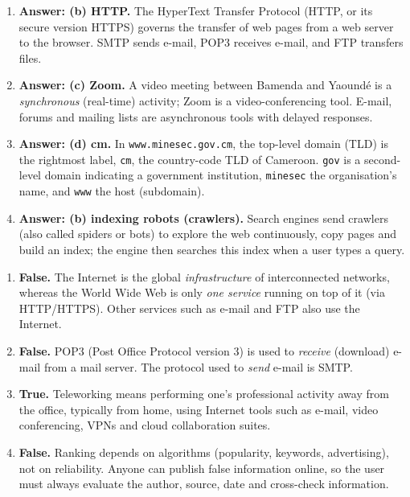 \documentclass[11pt]{article}
\newcommand{\cle}[1]{{\popxbold\color{popdark}#1}}
\begin{document}
\begin{corrige}
\begin{enumerate}
\item \textbf{Answer: (b) HTTP.} The \cle{HyperText Transfer Protocol} (HTTP, or its secure version HTTPS) governs the transfer of web pages from a web server to the browser. SMTP sends e-mail, POP3 receives e-mail, and FTP transfers files.
\item \textbf{Answer: (c) Zoom.} A video meeting between Bamenda and Yaoundé is a \emph{synchronous} (real-time) activity; Zoom is a video-conferencing tool. E-mail, forums and mailing lists are asynchronous tools with delayed responses.
\item \textbf{Answer: (d) cm.} In \texttt{www.minesec.gov.cm}, the \cle{top-level domain (TLD)} is the rightmost label, \texttt{cm}, the country-code TLD of Cameroon. \texttt{gov} is a second-level domain indicating a government institution, \texttt{minesec} the organisation's name, and \texttt{www} the host (subdomain).
\item \textbf{Answer: (b) indexing robots (crawlers).} Search engines send \cle{crawlers} (also called spiders or bots) to explore the web continuously, copy pages and build an index; the engine then searches this index when a user types a query.
\end{enumerate}
\end{corrige}

\begin{corrige}
\begin{enumerate}
\item \textbf{False.} The Internet is the global \emph{infrastructure} of interconnected networks, whereas the World Wide Web is only \emph{one service} running on top of it (via HTTP/HTTPS). Other services such as e-mail and FTP also use the Internet.
\item \textbf{False.} \cle{POP3} (Post Office Protocol version 3) is used to \emph{receive} (download) e-mail from a mail server. The protocol used to \emph{send} e-mail is SMTP.
\item \textbf{True.} Teleworking means performing one's professional activity away from the office, typically from home, using Internet tools such as e-mail, video conferencing, VPNs and cloud collaboration suites.
\item \textbf{False.} Ranking depends on algorithms (popularity, keywords, advertising), not on reliability. Anyone can publish false information online, so the user must always evaluate the author, source, date and cross-check information.
\end{enumerate}
\end{corrige}
\end{document}
